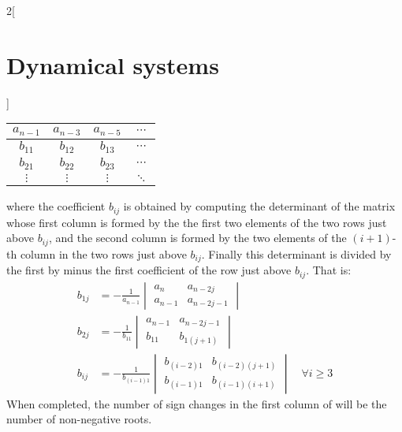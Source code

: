 \documentclass[../../../main_math.tex]{subfiles}
\begin{document}
\begin{multicols}{2}[\section{Dynamical systems}]
\begin{proposition}
\begin{center}
\begin{tabular}{|c|c|c|c|}
        \hline
        $a_{n-1}$ & $a_{n-3}$ & $a_{n-5}$ & $\cdots$ \\
        \hline
        $b_{11}$  & $b_{12}$  & $b_{13}$  & $\cdots$ \\
        \hline
        $b_{21}$  & $b_{22}$  & $b_{23}$  & $\cdots$ \\
        \hline
        $\vdots$  & $\vdots$  & $\vdots$  & $\ddots$ \\
        \hline
      \end{tabular}
      \label{DS:routhhurwitz}
    \end{center}
    where the coefficient $b_{ij}$  is obtained by computing the determinant of the matrix whose first column is formed by the the first two elements of the two rows just above $b_{ij}$, and the second column is formed by the two elements of the $(i+1)$-th column in the two rows just above $b_{ij}$. Finally this determinant is divided by the first by minus the first coefficient of the row just above $b_{ij}$. That is:
    \begin{align*}
      b_{1j} & =-\frac{1}{a_{n-1}}\begin{vmatrix}
                                    a_n     & a_{n-2j}   \\
                                    a_{n-1} & a_{n-2j-1}
                                  \end{vmatrix}                  \\
      b_{2j} & =-\frac{1}{b_{11}}\begin{vmatrix}
                                   a_{n-1} & a_{n-2j-1} \\
                                   b_{11}  & b_{1(j+1)}
                                 \end{vmatrix}                   \\
      b_{ij} & =-\frac{1}{b_{(i-1)1}}\begin{vmatrix}
                                       b_{(i-2)1} & b_{(i-2)(j+1)} \\
                                       b_{(i-1)1} & b_{(i-1)(i+1)}
                                     \end{vmatrix} \quad\forall i\geq 3
    \end{align*}
    When completed, the number of sign changes in the first column of  will be the number of non-negative roots.
  \end{proposition}

\end{multicols}
\end{document}
